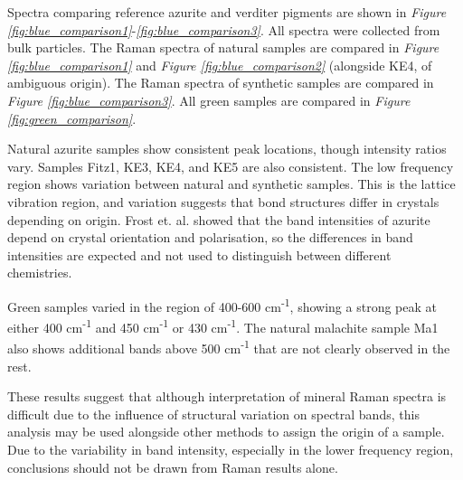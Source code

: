 Spectra comparing reference azurite and verditer pigments are shown in \textit{Figure \ref{fig:blue_comparison1}}-\textit{\ref{fig:blue_comparison3}}. All spectra were collected from bulk particles. The Raman spectra of natural samples are compared in \textit{Figure \ref{fig:blue_comparison1}} and \textit{Figure \ref{fig:blue_comparison2}} (alongside KE4, of ambiguous origin). The Raman spectra of synthetic samples are compared in \textit{Figure \ref{fig:blue_comparison3}}. All green samples are compared in \textit{Figure \ref{fig:green_comparison}}.

Natural azurite samples show consistent peak locations, though intensity ratios vary. Samples Fitz1, KE3, KE4, and KE5 are also consistent. The low frequency region shows variation between natural and synthetic samples. This is the lattice vibration region, and variation suggests that bond structures differ in crystals depending on origin. Frost et. al. showed that the band intensities of azurite depend on crystal orientation and polarisation, so the differences in band intensities are expected and not used to distinguish between different chemistries.~\autocite{Frost}

Green samples varied in the region of 400-600 cm\textsuperscript{-1}, showing a strong peak at either 400 cm\textsuperscript{-1} and 450 cm\textsuperscript{-1} or 430 cm\textsuperscript{-1}. The natural malachite sample Ma1 also shows additional bands above 500 cm\textsuperscript{-1} that are not clearly observed in the rest. 

These results suggest that although interpretation of mineral Raman spectra is difficult due to the influence of structural variation on spectral bands, this analysis may be used alongside other methods to assign the origin of a sample. Due to the variability in band intensity, especially in the lower frequency region, conclusions should not be drawn from Raman results alone.


